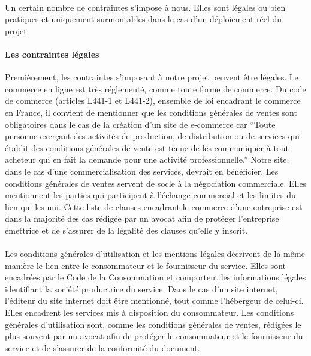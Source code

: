 \documentclass[a4paper, 12pt]{article}
\begin{document}
\paragraph{}Un certain nombre de contraintes s’impose à nous. Elles sont légales ou bien pratiques et uniquement surmontables dans le cas d’un déploiement réel du projet.
\paragraph{Les contraintes légales}Premièrement, les contraintes s’imposant à notre projet peuvent être légales. Le commerce en ligne est très réglementé, comme toute forme de commerce. Du code de commerce (articles L441-1 et L441-2), ensemble de loi encadrant le commerce en France, il convient de mentionner que les conditions générales de ventes sont obligatoires dans le cas de la création d’un site de e-commerce car “Toute personne exerçant des activités de production, de distribution ou de services qui établit des conditions générales de vente est tenue de les communiquer à tout acheteur qui en fait la demande pour une activité professionnelle.”\cite{code_commerce_1} Notre site, dans le cas d’une commercialisation des services, devrait en bénéficier. Les conditions générales de ventes servent de socle à la négociation commerciale.\cite{code_commerce_1} Elles mentionnent les parties qui participent à l’échange commercial et les limites du lien qui les uni. Cette liste de clauses encadrant le commerce d’une entreprise est dans la majorité des cas rédigée par un avocat afin de protéger l’entreprise émettrice et de s’assurer de la légalité des clauses qu’elle y inscrit.
\paragraph{}Les conditions générales d’utilisation et les mentions légales décrivent de la même manière le lien entre le consommateur et le fournisseur du service. Elles sont encadrées par le Code de la Consommation et comportent les informations légales identifiant la société productrice du service. \cite{code_consommation} Dans le cas d’un site internet, l’éditeur du site internet doit être mentionné, tout comme l’hébergeur de celui-ci. Elles encadrent les services mis à disposition du consommateur. Les conditions générales d’utilisation sont, comme les conditions générales de ventes, rédigées le plus souvent par un avocat afin de protéger le consommateur et le fournisseur du service et de s’assurer de la conformité du document.
\end{document}
